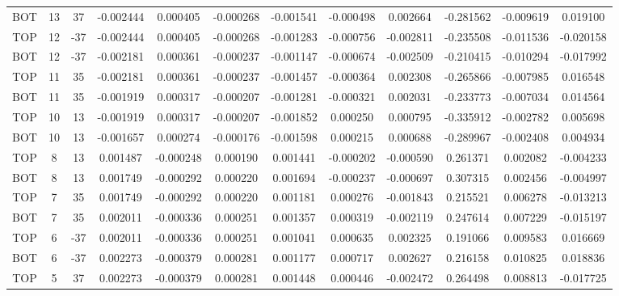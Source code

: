 \begin{landscape}
\begin{table}
\begin{tabular}{|ccc|ccc|ccc|ccc|}
BOT &   13 &     37 & -0.002444 &  0.000405 & -0.000268 & -0.001541 & -0.000498 &  0.002664 &      -0.281562 &      -0.009619 &       0.019100 \\
TOP &   12 &    -37 & -0.002444 &  0.000405 & -0.000268 & -0.001283 & -0.000756 & -0.002811 &      -0.235508 &      -0.011536 &      -0.020158 \\
BOT &   12 &    -37 & -0.002181 &  0.000361 & -0.000237 & -0.001147 & -0.000674 & -0.002509 &      -0.210415 &      -0.010294 &      -0.017992 \\
TOP &   11 &     35 & -0.002181 &  0.000361 & -0.000237 & -0.001457 & -0.000364 &  0.002308 &      -0.265866 &      -0.007985 &       0.016548 \\
BOT &   11 &     35 & -0.001919 &  0.000317 & -0.000207 & -0.001281 & -0.000321 &  0.002031 &      -0.233773 &      -0.007034 &       0.014564 \\
TOP &   10 &     13 & -0.001919 &  0.000317 & -0.000207 & -0.001852 &  0.000250 &  0.000795 &      -0.335912 &      -0.002782 &       0.005698 \\
BOT &   10 &     13 & -0.001657 &  0.000274 & -0.000176 & -0.001598 &  0.000215 &  0.000688 &      -0.289967 &      -0.002408 &       0.004934 \\
TOP &    8 &     13 &  0.001487 & -0.000248 &  0.000190 &  0.001441 & -0.000202 & -0.000590 &       0.261371 &       0.002082 &      -0.004233 \\
BOT &    8 &     13 &  0.001749 & -0.000292 &  0.000220 &  0.001694 & -0.000237 & -0.000697 &       0.307315 &       0.002456 &      -0.004997 \\
TOP &    7 &     35 &  0.001749 & -0.000292 &  0.000220 &  0.001181 &  0.000276 & -0.001843 &       0.215521 &       0.006278 &      -0.013213 \\
BOT &    7 &     35 &  0.002011 & -0.000336 &  0.000251 &  0.001357 &  0.000319 & -0.002119 &       0.247614 &       0.007229 &      -0.015197 \\
TOP &    6 &    -37 &  0.002011 & -0.000336 &  0.000251 &  0.001041 &  0.000635 &  0.002325 &       0.191066 &       0.009583 &       0.016669 \\
BOT &    6 &    -37 &  0.002273 & -0.000379 &  0.000281 &  0.001177 &  0.000717 &  0.002627 &       0.216158 &       0.010825 &       0.018836 \\
TOP &    5 &     37 &  0.002273 & -0.000379 &  0.000281 &  0.001448 &  0.000446 & -0.002472 &       0.264498 &       0.008813 &      -0.017725 \\

\end{tabular}
\end{table}
\end{landscape}
